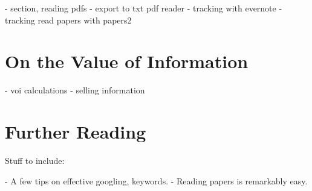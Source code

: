 - section, reading pdfs
- export to txt pdf reader
- tracking with evernote
- tracking read papers with papers2

\section{On the Value of Information}

- voi calculations
- selling information

\section{Further Reading}

Stuff to include:

- A few tips on effective googling, keywords.
- Reading papers is remarkably easy.

